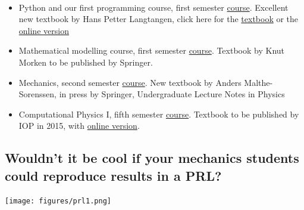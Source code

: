 \documentclass[%
twoside,                 %
final,                   %
10pt]{article}
\begin{document}
\paragraph{}
\begin{itemize}
\item Python and our first programming course, first semester \href{{http://www.uio.no/studier/emner/matnat/ifi/INF1100/h14/}}{course}. Excellent new textbook by Hans Petter Langtangen, click here for the \href{{http://www.amazon.com/Scientific-Programming-Computational-Science-Engineering-ebook/dp/B00DGER1NQ/ref=sr_1_2?ie=UTF8&qid=1425382942&sr=8-2&keywords=langtangen}}{textbook} or the \href{{http://hplgit.github.io/primer.html/doc/web/index.html}}{online version}

\item Mathematical modelling course, first semester \href{{http://www.uio.no/studier/emner/matnat/math/MAT-INF1100/h14/}}{course}. Textbook by Knut Morken to be published by Springer.

\item Mechanics, second semester \href{{http://www.uio.no/studier/emner/matnat/fys/FYS-MEK1100/v12/}}{course}. New textbook by Anders Malthe-Sorenssen, in press by Springer, Undergraduate Lecture Notes in Physics

\item Computational Physics I, fifth semester \href{{http://www.uio.no/studier/emner/matnat/fys/FYS3150/h14/}}{course}. Textbook to be published by IOP in 2015, with \href{{http://www.uio.no/studier/emner/matnat/fys/FYS3150/h14/undervisningsmateriale/Lecture%
\end{itemize}

\noindent





\subsection*{Wouldn't it be cool if your mechanics students could reproduce results in a PRL?}

\paragraph{}


\centerline{\texttt{[image: figures/prl1.png]}}
\end{document}
